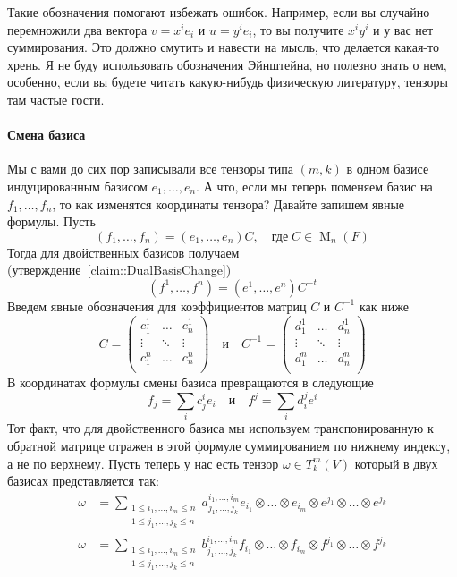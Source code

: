 Такие обозначения помогают избежать ошибок. Например, если вы случайно перемножили два вектора $v = x^i e_i$ и $u = y^i e_i$, то вы получите $x^i y^i$ и у вас нет суммирования.
Это должно смутить и  навести на мысль, что делается какая-то хрень.
Я не буду использовать обозначения Эйнштейна, но полезно знать о нем, особенно, если вы будете читать какую-нибудь физическую литературу, тензоры там частые гости.

\paragraph{Смена базиса}

Мы с вами до сих пор записывали все тензоры типа $(m,k)$ в одном базисе индуцированным базисом $e_1,\ldots,e_n$.
А что, если мы теперь поменяем базис на $f_1,\ldots,f_n$, то как изменятся координаты тензора?
Давайте запишем явные формулы.
Пусть
\[
(f_1,\ldots,f_n) = (e_1,\ldots,e_n)C,\quad\text{где}\;C\in \operatorname{M}_n(F)
\]
Тогда для двойственных базисов получаем (утверждение~\ref{claim::DualBasisChange})
\[
(f^1,\ldots,f^n) = (e^1,\ldots,e^n)C^{-t}
\]
Введем явные обозначения для коэффициентов матриц $C$ и $C^{-1}$ как ниже
\[
C =
\begin{pmatrix}
{c^1_1}&{\ldots}&{c^1_n}\\
{\vdots}&{\ddots}&{\vdots}\\
{c^n_1}&{\ldots}&{c^n_n}\\
\end{pmatrix}
\quad\text{и}\quad
C^{-1} =
\begin{pmatrix}
{d^1_1}&{\ldots}&{d^1_n}\\
{\vdots}&{\ddots}&{\vdots}\\
{d^n_1}&{\ldots}&{d^n_n}\\
\end{pmatrix}
\]
В координатах формулы смены базиса превращаются в следующие
\[
f_j = \sum_i c^i_j e_i
\quad\text{и}\quad
f^j = \sum_i d^j_i e^i
\]
Тот факт, что для двойственного базиса мы используем транспонированную к обратной матрице отражен в этой формуле суммированием по нижнему индексу, а не по верхнему.
Пусть теперь у нас есть тензор $\omega \in T^m_k(V)$ который в двух базисах представляется так:
\begin{align*}
\omega &= \sum_{\substack{1\leqslant i_1,\ldots,i_m\leqslant n\\1\leqslant j_1,\ldots,j_k\leqslant n}} a^{i_1,\ldots,i_m}_{j_1,\ldots,j_k}e_{i_1}\otimes \ldots \otimes e_{i_m}\otimes e^{j_1}\otimes \ldots \otimes e^{j_k}\\
\omega &= \sum_{\substack{1\leqslant i_1,\ldots,i_m\leqslant n\\1\leqslant j_1,\ldots,j_k\leqslant n}} b^{i_1,\ldots,i_m}_{j_1,\ldots,j_k}f_{i_1}\otimes \ldots \otimes f_{i_m}\otimes f^{j_1}\otimes \ldots \otimes f^{j_k}
\end{align*}
